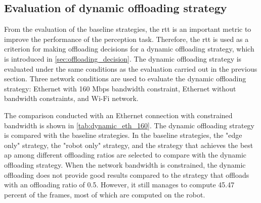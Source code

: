 
\subsection{Evaluation of dynamic offloading strategy}

 From the evaluation of the baseline strategies, the \gls{rtt} is an important metric to improve the performance of the perception task. Therefore, the \gls{rtt} is used as a criterion for making offloading decisions for a dynamic offloading strategy, which is introduced in \cref{sec:offloading_decision}. The dynamic offloading strategy is evaluated under the same conditions as the evaluation carried out in the previous section. Three network conditions are used to evaluate the dynamic offloading strategy: Ethernet with 160 Mbps bandwidth constraint, Ethernet without bandwidth constraints, and Wi-Fi network. 

 The comparison conducted with an Ethernet connection with constrained bandwidth is shown in \cref{tab:dynamic_eth_160}. The dynamic offloading strategy is compared with the baseline strategies. In the baseline strategies, the "edge only" strategy, the "robot only" strategy, and the strategy that achieves the best \gls{ap} among different offloading ratios are selected to compare with the dynamic offloading strategy. When the network bandwidth is constrained, the dynamic offloading does not provide good results compared to the strategy that offloads with an offloading ratio of 0.5. However, it still manages to compute 45.47 percent of the frames, most of which are computed on the robot.

